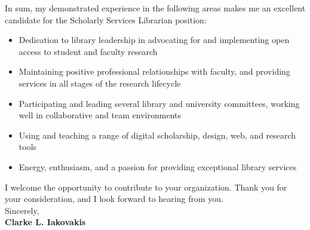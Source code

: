 \documentclass[12pt]{article}
\begin{document}
In sum, my demonstrated experience in the following areas makes me an excellent candidate for the Scholarly Services Librarian position:
\begin{itemize}
   \itemsep-0.25em \vspace{-1em} %
	\item Dedication to library leadership in advocating for and implementing open access to student and faculty research
	\item Maintaining positive professional relationships with faculty, and providing services in all stages of the research lifecycle
	\item Participating and leading several library and university committees, working well in collaborative and team environments
	\item Using and teaching a range of digital scholarship, design, web, and research tools
	\item Energy, enthusiasm, and a passion for providing exceptional library services
\end{itemize}\vspace{-.5em}
I welcome the opportunity to contribute to your organization. Thank you for your consideration, and I look forward to hearing from you. \\[1em]

Sincerely,\\[2em] 
{\bfseries Clarke L. Iakovakis}
\end{document}
